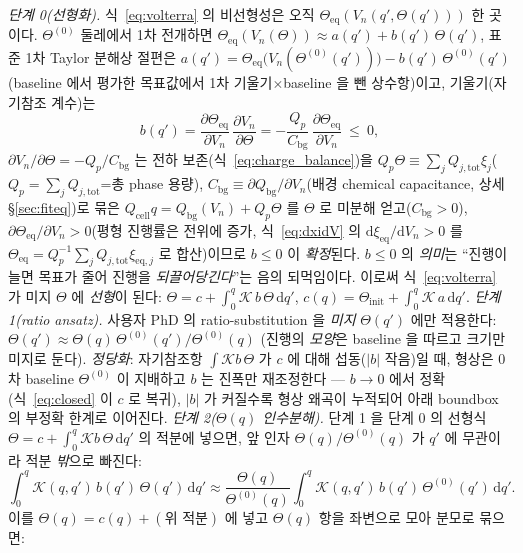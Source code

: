 \documentclass[11pt,a4paper]{article}
\newcommand{\dd}{\mathrm{d}}
\newcommand{\eq}{\mathrm{eq}}
\newcommand{\bg}{\mathrm{bg}}
\newcommand{\cell}{\mathrm{cell}}
\newcommand{\tot}{\mathrm{tot}}
\begin{document}
\emph{단계 0(선형화).} 식~\eqref{eq:volterra} 의 비선형성은 오직 $\Theta_\eq(V_n(q',\Theta(q')))$ 한 곳이다.
$\Theta^{(0)}$ 둘레에서 1차 전개하면 $\Theta_\eq(V_n(\Theta))\approx a(q')+b(q')\,\Theta(q')$, 표준 1차 Taylor
분해상 절편은 $a(q')=\Theta_\eq\big(V_n(\Theta^{(0)}(q'))\big)-b(q')\,\Theta^{(0)}(q')$(baseline 에서 평가한 목표값에서
1차 기울기$\times$baseline 을 뺀 상수항)이고, 기울기(자기참조 계수)는
\begin{equation}
b(q')=\frac{\partial\Theta_\eq}{\partial V_n}\,\frac{\partial V_n}{\partial\Theta}
=-\frac{Q_p}{C_\bg}\,\frac{\partial\Theta_\eq}{\partial V_n}\ \le\ 0,
\label{eq:selfcoupling}
\end{equation}
$\partial V_n/\partial\Theta=-Q_p/C_\bg$ 는 전하 보존(식~\eqref{eq:charge_balance})을 $Q_p\Theta\equiv\sum_j
Q_{j,\tot}\xi_j$($Q_p=\sum_j Q_{j,\tot}$=총 phase 용량), $C_\bg\equiv\partial Q_\bg/\partial V_n$(배경 chemical
capacitance, 상세 \S\ref{sec:fiteq})로 묶은 $Q_\cell q=Q_\bg(V_n)+Q_p\Theta$ 를 $\Theta$ 로 미분해 얻고($C_\bg>0$), $\partial\Theta_\eq/\partial V_n>0$(평형 진행률은 전위에 증가, 식~\eqref{eq:dxidV} 의 $\dd\xi_\eq/\dd V_n>0$
를 $\Theta_\eq=Q_p^{-1}\sum_j Q_{j,\tot}\xi_{\eq,j}$ 로 합산)이므로 $b\le0$ 이 \emph{확정}된다. $b\le0$ 의 \emph{의미}는
``진행이 늘면 목표가 줄어 진행을 \emph{되끌어당긴다}''는 음의 되먹임이다.
이로써 식~\eqref{eq:volterra} 가 미지 $\Theta$ 에 \emph{선형}이 된다: $\Theta=c+\int_0^q\mathcal K\,b\,\Theta\,\dd q'$,
$c(q)=\Theta_\mathrm{init}+\int_0^q\mathcal K\,a\,\dd q'$.
\emph{단계 1(ratio ansatz).} 사용자 PhD \cite{lee2011,son2013} 의 ratio-substitution 을 \emph{미지} $\Theta(q')$
에만 적용한다: $\Theta(q')\approx\Theta(q)\,\Theta^{(0)}(q')/\Theta^{(0)}(q)$ (진행의 \emph{모양}은 baseline 을
따르고 크기만 미지로 둔다). \emph{정당화}: 자기참조항 $\int\mathcal K b\,\Theta$ 가 $c$ 에 대해 섭동($|b|$ 작음)일
때, 형상은 0차 baseline $\Theta^{(0)}$ 이 지배하고 $b$ 는 진폭만 재조정한다 — $b\to0$ 에서 정확(식~\eqref{eq:closed}
이 $c$ 로 복귀), $|b|$ 가 커질수록 형상 왜곡이 누적되어 아래 boundbox 의 부정확 한계로 이어진다.
\emph{단계 2($\Theta(q)$ 인수분해).} 단계 1 을 단계 0 의 선형식 $\Theta=c+\int_0^q\mathcal K b\,\Theta\,\dd q'$ 의
적분에 넣으면, 앞 인자 $\Theta(q)/\Theta^{(0)}(q)$ 가 $q'$ 에 무관이라 적분 \emph{밖}으로 빠진다:
\begin{equation*}
\int_0^q\mathcal K(q,q')\,b(q')\,\Theta(q')\,\dd q'\approx\frac{\Theta(q)}{\Theta^{(0)}(q)}\int_0^q\mathcal K(q,q')\,b(q')\,\Theta^{(0)}(q')\,\dd q'.
\end{equation*}
이를 $\Theta(q)=c(q)+(\text{위 적분})$ 에 넣고 $\Theta(q)$ 항을 좌변으로 모아 분모로 묶으면:
\end{document}
